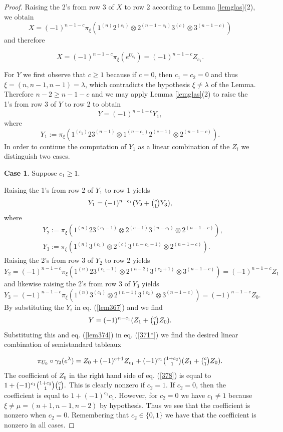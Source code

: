 \documentclass[11pt]{amsart}
\theoremstyle{definition}
\numberwithin{equation}{section}
\begin{document}
\begin{proof}
   Raising the 2's from row 3 of $X$ to row 2 according to Lemma \ref{lemglas}(2), we obtain 
	\[X=(-1)^{n-1-c}\pi_\xi(1^{(n)}2^{(c_1)} \otimes 2^{(n-1-c_1)}3^{(c)} \otimes 3^{(n-1-c)})\] and therefore 
	
		\begin{equation}\label{lem374} X=(-1)^{n-1-c}\pi_\xi(e^{U_{c_1}})=(-1)^{n-1-c}Z_{c_1}.\end{equation}
		
	
	
	For $Y$ we first observe that $c \ge 1$ because if $c=0$, then $c_1=c_2=0$ and thus $\xi=(n,n-1,n-1)=\lambda$, which contradicts the hypothesis $\xi \neq \lambda$ of the Lemma. Therefore $n-2 \ge n-1-c$ and we may apply Lemma \ref{lemglas}(2) to raise the 1's from  row 3 of $Y$ to row 2 to obtain \begin{equation}\label{lem367}Y=(-1)^{n-1-c}Y_{1},\end{equation}
	where \begin{equation}\label{lem367b}Y_1:=\pi_\xi(1^{(c_1)}23^{(n-1)} \otimes 1^{(n-c_1)}2^{(c-1)} \otimes 2^{(n-1-c)}).\end{equation}
	In order to continue the computation of $Y_1$ as a linear combination of the $Z_i$ we distinguish two cases.
	
	\textbf{Case 1}. Suppose $c_1 \ge 1$.
	
	Raising the 1's from row 2 of $Y_1$ to row 1 yields \[Y_1=(-1)^{n-c_1}(Y_2+\tbinom{c}{1}Y_3),\]
	where
	\begin{align*}&Y_2:= \pi_\xi(1^{(n)}23^{(c_1-1)} \otimes 2^{(c-1)}3^{(n-c_1)} \otimes 2^{(n-1-c)}), \\& Y_3:=\pi_\xi(1^{(n)}3^{(c_1)} \otimes 2^{(c)}3^{(n-c_1-1)}\otimes 2^{(n-1-c)}).\end{align*}
	Raising the 2's from row 3 of $Y_2$ to row 2 yields \[Y_2= (-1)^{n-1-c}\pi_\xi(1^{(n)}23^{(c_1-1)} \otimes 2^{(n-2)}3^{(c_2+1)} \otimes 3^{(n-1-c)})=(-1)^{n-1-c}Z_1\]
	and likewise raising the 2's from row 3 of $Y_3$ yields \[Y_3= (-1)^{n-1-c}\pi_\xi(1^{(n)}3^{(c_1)} \otimes 2^{(n-1)}3^{(c_2)} \otimes 3^{(n-1-c)})=(-1)^{n-1-c}Z_0.\]
	By substituting the $Y_i$ in eq. (\ref{lem367}) and we find \[Y= (-1)^{n-c_1}(Z_1+\tbinom{c}{1}Z_0).\]
	Substituting this and eq. (\ref{lem374}) in eq. (\ref{371*}) we find the desired linear combination of semistandard tableaux  
	
	\begin{equation}\label{378}
		\pi_{U_0} \circ \gamma_2 (e^\lambda) = 	Z_0+(-1)^{c+1}Z_{c_1}+(-1)^{c_1}\tbinom{1+c_2}{1}(Z_1 +\tbinom{c}{1}Z_0).
	\end{equation}
	The coefficient of $Z_0$ in the right hand side of eq. (\ref{378}) is equal to $1+(-1)^{c_1}\tbinom{1+c_2}{1} \tbinom{c}{1}.$ This is clearly nonzero if $c_2=1$. If $c_2=0$, then the coefficient is equal to $1+(-1)^{c_1}c_1$. However, for $c_2=0$ we have $c_1 \neq 1$ because $\xi \neq \mu = (n+1,n-1,n-2)$ by hypothesis. Thus we see that the coefficient is nonzero when $c_2=0$. Remembering that $c_2\in \{0,1\}$ we have that the coefficient is nonzero in all cases.
	

\end{proof}
\end{document}

